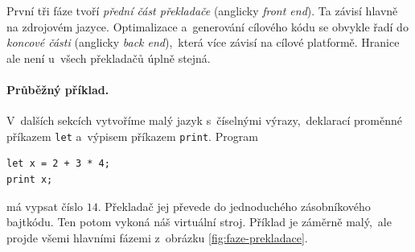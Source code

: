 První tři fáze tvoří \emph{přední část překladače} (anglicky \emph{front end}). Ta závisí hlavně na zdrojovém jazyce. Optimalizace a~generování cílového kódu se obvykle řadí do \emph{koncové části} (anglicky \emph{back end}),~která více závisí na cílové platformě. Hranice ale není u~všech překladačů úplně stejná.


\paragraph{Průběžný příklad.}

V~dalších sekcích vytvoříme malý jazyk s~číselnými výrazy,~deklarací proměnné příkazem \texttt{let} a~výpisem příkazem \texttt{print}. Program
\begin{verbatim}
let x = 2 + 3 * 4;
print x;
\end{verbatim}
má vypsat číslo $14$. Překladač jej převede do jednoduchého zásobníkového bajtkódu. Ten potom vykoná náš virtuální stroj. Příklad je záměrně malý,~ale projde všemi hlavními fázemi z~obrázku \ref{fig:faze-prekladace}.
